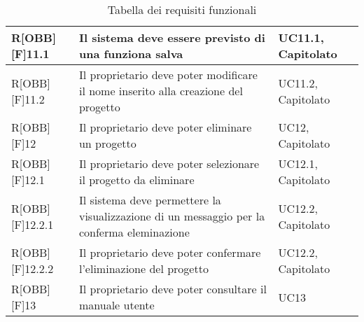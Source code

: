 	\begin{table}[h]
		\begin{tabular}{|p{}|p{}|p{}|}
			\midrule
	
			R[OBB][F]11.1 & Il sistema deve essere previsto di una funziona salva & UC11.1, Capitolato \\ \midrule
			R[OBB][F]11.2 & Il proprietario deve poter modificare il nome inserito alla creazione del progetto & UC11.2, Capitolato \\ \midrule
			R[OBB][F]12 & Il proprietario deve poter eliminare un progetto & UC12, Capitolato \\ \midrule
			R[OBB][F]12.1 & Il proprietario deve poter selezionare il progetto da eliminare & UC12.1, Capitolato \\ \midrule
			R[OBB][F]12.2.1 & Il sistema deve permettere la visualizzazione di un messaggio per la conferma eleminazione & UC12.2, Capitolato \\ \midrule
			R[OBB][F]12.2.2 & Il proprietario deve poter confermare l'eliminazione del progetto  & UC12.2, Capitolato \\ \midrule
			R[OBB][F]13 & Il proprietario deve poter consultare il manuale utente & UC13 \\
	
			\bottomrule
	
		\end{tabular}
		\caption{Tabella dei requisiti funzionali}
	\end{table}
	\newpage